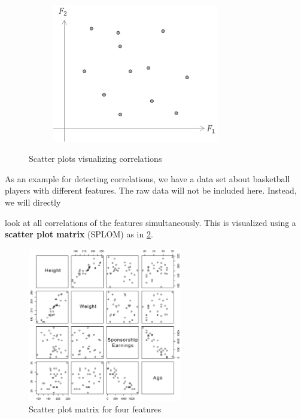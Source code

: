 \begin{figure}[H]
\begin{subfigure}{0.3\textwidth}
    \includegraphics[width=0.8\textwidth]{assets/visualization_and_extraction/feature_relation/scatter_not_cor.png}
  \end{subfigure}
  \caption{Scatter plots visualizing correlations}
  \label{fig:2_correlation}
\end{figure}

\begin{note}As an example for detecting correlations, we have a data set about basketball players with different features. The raw data will not be included here. Instead, we will directly \end{note}look at all correlations of the features simultaneously. This is visualized using a \textbf{scatter plot matrix} (SPLOM) as in \ref{fig:2_splom}.

\begin{figure}[h]
  \centering
  \includegraphics[width=0.6\textwidth]{assets/visualization_and_extraction/feature_relation/splom.png}
  \caption{Scatter plot matrix for four features}
  \label{fig:2_splom}
\end{figure}

